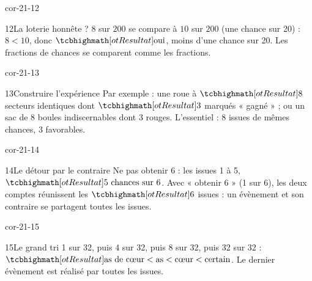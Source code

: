 \begin{blocLivre}{cor-21-12}\begin{corrige}{12}{La loterie honnête ?}
$8$ sur $200$ se compare à $10$ sur $200$ (une chance sur 20) : $8<10$, donc $\res{\text{oui}}$, moins d’une chance sur 20. Les fractions de chances se comparent comme les fractions.
\end{corrige}\end{blocLivre}
\begin{blocLivre}{cor-21-13}\begin{corrige}{13}{Construire l’expérience}
Par exemple : une roue à $\res8$ secteurs identiques dont $\res3$ marqués « gagné » ; ou un sac de 8 boules indiscernables dont 3 rouges. L’essentiel : 8 issues de mêmes chances, 3 favorables.
\end{corrige}\end{blocLivre}
\begin{blocLivre}{cor-21-14}\begin{corrige}{14}{Le détour par le contraire}
Ne pas obtenir 6 : les issues 1 à 5, $\res{5\ \text{chances sur }6}$. Avec « obtenir 6 » (1 sur 6), les deux comptes réunissent les $\res6$ issues : un évènement et son contraire se partagent toutes les issues.
\end{corrige}\end{blocLivre}
\begin{blocLivre}{cor-21-15}\begin{corrige}{15}{Le grand tri}
1 sur 32, puis 4 sur 32, puis 8 sur 32, puis 32 sur 32 : $\res{\text{as de cœur}<\text{as}<\text{cœur}<\text{certain}}$. Le dernier évènement est réalisé par toutes les issues.
\end{corrige}\end{blocLivre}
